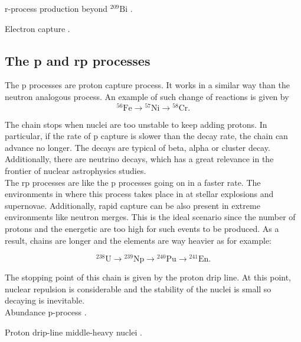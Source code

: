 \documentclass[openany]{book}
\begin{document}
r-process production beyond $\mathrm{{}^{209}Bi}$ \cite{qian_vogel_wasserburg_1999}.

Electron capture \cite{langanke_martinez-pinedo_zegers_2021}.



\subsection{The p and rp processes} \label{sub:pProcesses}

The p processes are proton capture process. It works in a similar way than the neutron analogous process. An example of such change of reactions is given by \\

\begin{equation}\label{eq:reactions_pProcess}
	\mathrm{{}^{56}Fe \rightarrow {}^{57}Ni \rightarrow  {}^{58}Cr }.
\end{equation}

The chain stops when nuclei are too unstable to keep adding protons. In particular, if the rate of p capture is slower than the decay rate, the chain can advance no longer. The decays are typical of beta, alpha or cluster decay. Additionally, there are neutrino decays, which has a great relevance in the frontier of nuclear astrophysics studies. \\

The rp processes are like the p processes going on in a faster rate. The environments in where this process takes place in at stellar explosions and supernovae. Additionally, rapid capture can be also present in extreme environments like neutron merges. This is the ideal scenario since the number of protons and the energetic are too high for such events to be produced. As a result, chains are longer and the elements are way heavier as for example:

\begin{equation}\label{eq:reactions_rpProcess}
	\mathrm{{}^{238}U \rightarrow {}^{239}Np \rightarrow  {}^{240}Pu \rightarrow  {}^{241}En }.
	\end{equation}

The stopping point of this chain is given by the proton drip line. At this point, nuclear repulsion is  considerable and the stability of the nuclei is small so decaying is inevitable.   \\
		
Abundance p-process \cite{delaeter_2008}.

Proton drip-line middle-heavy nuclei \cite{cai_chen_yuan_jian-jun_2022}.
\end{document}
